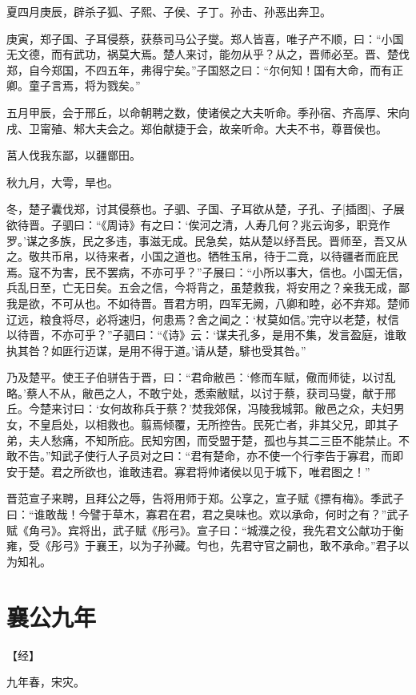 \documentclass[a4paper,12pt,UTF8,twoside]{ctexbook}
\begin{document}
夏四月庚辰，辟杀子狐、子熙、子侯、子丁。孙击、孙恶出奔卫。

庚寅，郑子国、子耳侵蔡，获蔡司马公子燮。郑人皆喜，唯子产不顺，曰：“小国无文德，而有武功，祸莫大焉。楚人来讨，能勿从乎？从之，晋师必至。晋、楚伐郑，自今郑国，不四五年，弗得宁矣。”子国怒之曰：“尔何知！国有大命，而有正卿。童子言焉，将为戮矣。”

五月甲辰，会于邢丘，以命朝聘之数，使诸侯之大夫听命。季孙宿、齐高厚、宋向戌、卫甯殖、邾大夫会之。郑伯献捷于会，故亲听命。大夫不书，尊晋侯也。

莒人伐我东鄙，以疆鄫田。

秋九月，大雩，旱也。

冬，楚子囊伐郑，讨其侵蔡也。子驷、子国、子耳欲从楚，子孔、子[插图]、子展欲待晋。子驷曰：“《周诗》有之曰：‘俟河之清，人寿几何？兆云询多，职竞作罗。’谋之多族，民之多违，事滋无成。民急矣，姑从楚以纾吾民。晋师至，吾又从之。敬共币帛，以待来者，小国之道也。牺牲玉帛，待于二竟，以待疆者而庇民焉。寇不为害，民不罢病，不亦可乎？”子展曰：“小所以事大，信也。小国无信，兵乱日至，亡无日矣。五会之信，今将背之，虽楚救我，将安用之？亲我无成，鄙我是欲，不可从也。不如待晋。晋君方明，四军无阙，八卿和睦，必不弃郑。楚师辽远，粮食将尽，必将速归，何患焉？舍之闻之：‘杖莫如信。’完守以老楚，杖信以待晋，不亦可乎？”子驷曰：“《诗》云：‘谋夫孔多，是用不集，发言盈庭，谁敢执其咎？如匪行迈谋，是用不得于道。’请从楚，騑也受其咎。”

乃及楚平。使王子伯骈告于晋，曰：“君命敝邑：‘修而车赋，儆而师徒，以讨乱略。’蔡人不从，敝邑之人，不敢宁处，悉索敝赋，以讨于蔡，获司马燮，献于邢丘。今楚来讨曰：‘女何故称兵于蔡？’焚我郊保，冯陵我城郭。敝邑之众，夫妇男女，不皇启处，以相救也。翦焉倾覆，无所控告。民死亡者，非其父兄，即其子弟，夫人愁痛，不知所庇。民知穷困，而受盟于楚，孤也与其二三臣不能禁止。不敢不告。”知武子使行人子员对之曰：“君有楚命，亦不使一个行李告于寡君，而即安于楚。君之所欲也，谁敢违君。寡君将帅诸侯以见于城下，唯君图之！”

晋范宣子来聘，且拜公之辱，告将用师于郑。公享之，宣子赋《摽有梅》。季武子曰：“谁敢哉！今譬于草木，寡君在君，君之臭味也。欢以承命，何时之有？”武子赋《角弓》。宾将出，武子赋《彤弓》。宣子曰：“城濮之役，我先君文公献功于衡雍，受《彤弓》于襄王，以为子孙藏。匄也，先君守官之嗣也，敢不承命。”君子以为知礼。

\section{襄公九年}


【经】

九年春，宋灾。
\end{document}
